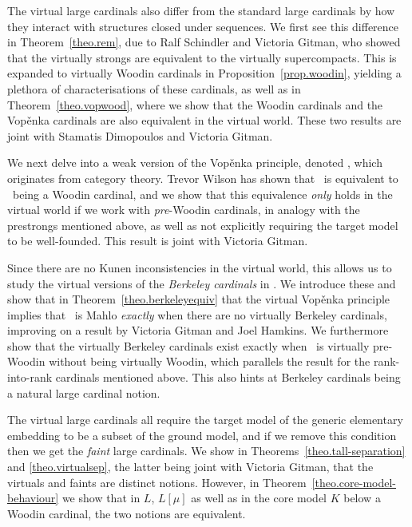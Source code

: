 \documentclass[../main]{subfiles}
\begin{document}
\begin{onehalfspacing}
\quad The virtual large cardinals also differ from the standard large cardinals by how they interact with structures closed under sequences. We first see this difference in Theorem~\ref{theo.rem}, due to Ralf Schindler and Victoria Gitman, who showed that the virtually strongs are equivalent to the virtually supercompacts. This is expanded to virtually Woodin cardinals in Proposition~\ref{prop.woodin}, yielding a plethora of characterisations of these cardinals, as well as in Theorem~\ref{theo.vopwood}, where we show that the Woodin cardinals and the Vop\v enka cardinals are also equivalent in the virtual world. These two results are joint with Stamatis Dimopoulos and Victoria Gitman.

\quad We next delve into a weak version of the Vop\v enka principle, denoted \wvp, which originates from category theory. Trevor Wilson has shown that \wvp\ is equivalent to \on\ being a Woodin cardinal, and we show that this equivalence \textit{only} holds in the virtual world if we work with \textit{pre}-Woodin cardinals, in analogy with the prestrongs mentioned above, as well as not explicitly requiring the target model to be well-founded. This result is joint with Victoria Gitman.

\quad Since there are no Kunen inconsistencies in the virtual world, this allows us to study the virtual versions of the \textit{Berkeley cardinals} in \zfc. We introduce these and show that in Theorem~\ref{theo.berkeleyequiv} that the virtual Vop\v enka principle implies that \on\ is Mahlo \textit{exactly} when there are no virtually Berkeley cardinals, improving on a result by Victoria Gitman and Joel Hamkins. We furthermore show that the virtually Berkeley cardinals exist exactly when \on\ is virtually pre-Woodin without being virtually Woodin, which parallels the result for the rank-into-rank cardinals mentioned above. This also hints at Berkeley cardinals being a natural large cardinal notion.

\quad The virtual large cardinals all require the target model of the generic elementary embedding to be a subset of the ground model, and if we remove this condition then we get the \textit{faint} large cardinals. We show in Theorems~\ref{theo.tall-separation} and \ref{theo.virtualsep}, the latter being joint with Victoria Gitman, that the virtuals and faints are distinct notions. However, in Theorem~\ref{theo.core-model-behaviour} we show that in $L$, $L[\mu]$ as well as in the core model $K$ below a Woodin cardinal, the two notions are equivalent.


\end{onehalfspacing}
\end{document}
